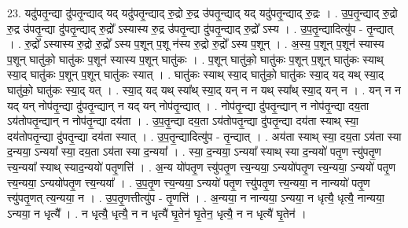 \documentclass[17pt]{extarticle}
\begin{document}
23. यदु॑पतृ॒न्द्या दु॑पतृ॒न्द्याद् यद् यदु॑पतृ॒न्द्याद् रु॒द्रो रु॒द्र उ॑पतृ॒न्द्याद् यद् यदु॑पतृ॒न्द्याद् रु॒द्रः । . उ॒प॒तृ॒न्द्याद् रु॒द्रो रु॒द्र उ॑पतृ॒न्द्या दु॑पतृ॒न्द्याद् रु॒द्रो᳚ ऽस्यास्य रु॒द्र उ॑पतृ॒न्द्या दु॑पतृ॒न्द्याद् रु॒द्रो᳚ ऽस्य । . उ॒प॒तृ॒न्द्यादित्यु॑प - तृ॒न्द्यात् । . रु॒द्रो᳚ ऽस्यास्य रु॒द्रो रु॒द्रो᳚ ऽस्य प॒शून् प॒शू न॑स्य रु॒द्रो रु॒द्रो᳚ ऽस्य प॒शून् । . अ॒स्य॒ प॒शून् प॒शून॑ स्यास्य प॒शून् घातु॑को॒ घातु॑कः प॒शून॑ स्यास्य प॒शून् घातु॑कः । . प॒शून् घातु॑को॒ घातु॑कः प॒शून् प॒शून् घातु॑कः स्याथ् स्या॒द् घातु॑कः प॒शून् प॒शून् घातु॑कः स्यात् । . घातु॑कः स्याथ् स्या॒द् घातु॑को॒ घातु॑कः स्या॒द् यद् यथ् स्या॒द् घातु॑को॒ घातु॑कः स्या॒द् यत् । . स्या॒द् यद् यथ् स्या᳚थ् स्या॒द् यन् न न यथ् स्या᳚थ् स्या॒द् यन् न । . यन् न न यद् यन् नोप॑तृ॒न्द्या दु॑पतृ॒न्द्यान् न यद् यन् नोप॑तृ॒न्द्यात् । . नोप॑तृ॒न्द्या दु॑पतृ॒न्द्यान् न नोप॑तृ॒न्द्या दय॒ता ऽय॑तोपतृ॒न्द्यान् न नोप॑तृ॒न्द्या दय॑ता । . उ॒प॒तृ॒न्द्या दय॒ता ऽय॑तोपतृ॒न्द्या दु॑पतृ॒न्द्या दय॑ता स्याथ् स्या॒ दय॑तोपतृ॒न्द्या दु॑पतृ॒न्द्या दय॑ता स्यात् । . उ॒प॒तृ॒न्द्यादित्यु॑प - तृ॒न्द्यात् । . अय॑ता स्याथ् स्या॒ दय॒ता ऽय॑ता स्या द॒न्यया॒ ऽन्यया᳚ स्या॒ दय॒ता ऽय॑ता स्या द॒न्यया᳚ । . स्या॒ द॒न्यया॒ ऽन्यया᳚ स्याथ् स्या द॒न्ययो॑ पतृ॒ण त्त्यु॑पतृ॒ण त्त्य॒न्यया᳚ स्याथ् स्याद॒न्ययो॑ पतृ॒णत्ति॑ । . अ॒न्य यो॑पतृ॒ण त्त्यु॑पतृ॒ण त्त्य॒न्यया॒ ऽन्ययो॑पतृ॒ण त्त्य॒न्यया॒ ऽन्ययो॑ पतृ॒ण त्त्य॒न्यया॒ ऽन्ययो॑पतृ॒ण त्त्य॒न्यया᳚ । . उ॒प॒तृ॒ण त्त्य॒न्यया॒ ऽन्ययो॑ पतृ॒ण त्त्यु॑पतृ॒ण त्त्य॒न्यया॒ न नान्ययो॑ पतृ॒ण त्त्यु॑पतृ॒णत् त्य॒न्यया॒ न । . उ॒प॒तृ॒णत्तीत्यु॑प - तृ॒णत्ति॑ । . अ॒न्यया॒ न नान्यया॒ ऽन्यया॒ न धृत्यै॒ धृत्यै॒ नान्यया॒ ऽन्यया॒ न धृत्यै᳚ । . न धृत्यै॒ धृत्यै॒ न न धृत्यै॑ घृ॒तेन॑ घृ॒तेन॒ धृत्यै॒ न न धृत्यै॑ घृ॒तेन॑ । \newline
\end{document}
